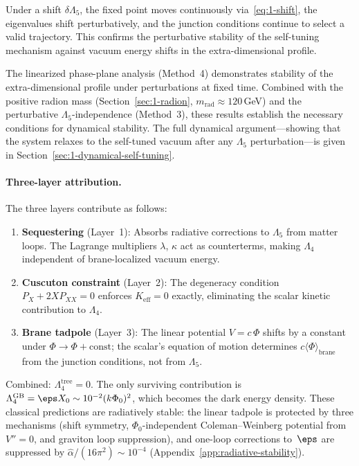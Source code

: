 Under a shift $\delta\Lambda_5$, the fixed point moves continuously via~\eqref{eq:1-shift}, the eigenvalues shift perturbatively, and the junction conditions continue to select a valid trajectory. This confirms the perturbative stability of the self-tuning mechanism against vacuum energy shifts in the extra-dimensional profile.

\begin{remark}
\label{rem:1-stability-scope}
The linearized phase-plane analysis (Method~4) demonstrates stability of the extra-dimensional profile under perturbations at fixed time. Combined with the positive radion mass (Section~\ref{sec:1-radion}, $m_{\mathrm{rad}} \approx 120\,$GeV) and the perturbative $\Lambda_5$-independence (Method~3), these results establish the necessary conditions for dynamical stability. The full dynamical argument---showing that the system relaxes to the self-tuned vacuum after any $\Lambda_5$ perturbation---is given in Section~\ref{sec:1-dynamical-self-tuning}.
\end{remark}

\paragraph{Three-layer attribution.} The three layers contribute as follows:
\begin{enumerate}
\item \textbf{Sequestering} (Layer~1): Absorbs radiative corrections to $\Lambda_5$ from matter loops. The Lagrange multipliers $\lambda$, $\kappa$ act as counterterms, making $\Lambda_4$ independent of brane-localized vacuum energy.
\item \textbf{Cuscuton constraint} (Layer~2): The degeneracy condition $P_X + 2X P_{XX} = 0$ enforces $K_{\mathrm{eff}} = 0$ exactly, eliminating the scalar kinetic contribution to $\Lambda_4$.
\item \textbf{Brane tadpole} (Layer~3): The linear potential $V = c\,\Phi$ shifts by a constant under $\Phi \to \Phi + \mathrm{const}$; the scalar's equation of motion determines $c\langle\Phi\rangle_{\mathrm{brane}}$ from the junction conditions, not from $\Lambda_5$.
\end{enumerate}
\noindent Combined: $\Lambda_4^{\mathrm{tree}} = 0$. The only surviving contribution is $\Lambda_4^{\mathrm{GB}} = \eps X_0 \sim 10^{-2}(k\Phi_0)^2$, which becomes the dark energy density. These classical predictions are radiatively stable: the linear tadpole is protected by three mechanisms (shift symmetry, $\Phi_0$-independent Coleman--Weinberg potential from $V'' = 0$, and graviton loop suppression), and one-loop corrections to~$\eps$ are suppressed by $\hat{\alpha}/(16\pi^2) \sim 10^{-4}$ (Appendix~\ref{app:radiative-stability}).


